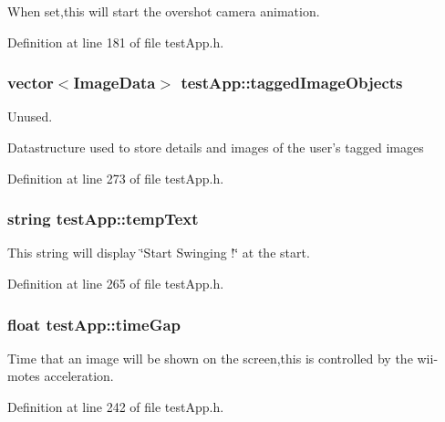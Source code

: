 When set,this will start the overshot camera animation. 



Definition at line 181 of file test\-App.\-h.

\hypertarget{classtest_app_af65c8dc2f4620bfe7fdf6a39043cb48d}{
\subsubsection[{tagged\-Image\-Objects}]{\setlength{\rightskip}{0pt plus 5cm}vector$<${\bf Image\-Data}$>$ test\-App\-::tagged\-Image\-Objects}}\label{classtest_app_af65c8dc2f4620bfe7fdf6a39043cb48d}


Unused. 

Datastructure used to store details and images of the user's tagged images 

Definition at line 273 of file test\-App.\-h.

\hypertarget{classtest_app_ad9a4beab6f2e0f13d32b00b502e89bdc}{
\subsubsection[{temp\-Text}]{\setlength{\rightskip}{0pt plus 5cm}string test\-App\-::temp\-Text}}\label{classtest_app_ad9a4beab6f2e0f13d32b00b502e89bdc}


This string will display \char`\"{}\-Start Swinging !\char`\"{} at the start. 



Definition at line 265 of file test\-App.\-h.

\hypertarget{classtest_app_a944f2713019239a4b49241a5cc9a00c9}{
\subsubsection[{time\-Gap}]{\setlength{\rightskip}{0pt plus 5cm}float test\-App\-::time\-Gap}}\label{classtest_app_a944f2713019239a4b49241a5cc9a00c9}


Time that an image will be shown on the screen,this is controlled by the wii-\/motes acceleration. 



Definition at line 242 of file test\-App.\-h.

